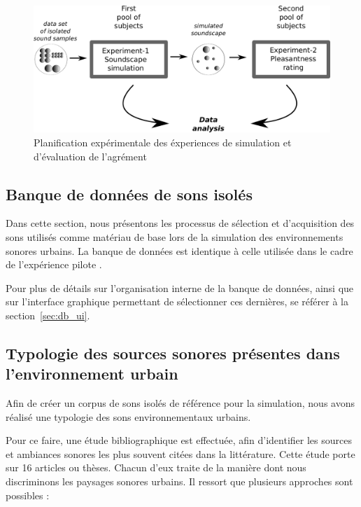 \begin{figure}[t]
        \myfloatalign
        \includegraphics[width=.8\linewidth]{gfx/5}
        \caption{Planification expérimentale des éxperiences de simulation et d'évaluation de l'agrément}\label{fig:xp1_2}
\end{figure}



\subsection{Banque de données de sons isolés}

Dans cette section, nous présentons les processus de sélection et d'acquisition des sons utilisés comme matériau de base lors de la simulation des environnements sonores urbains. La banque de données est identique à celle utilisée dans le cadre de l'expérience pilote \citep{lafay2013atiam,lafay2014new}. 

Pour plus de détails sur l'organisation interne de la banque de données, ainsi que sur l'interface graphique permettant de sélectionner ces dernières, se référer à la section~\ref{sec:db_ui}.

\subsection{Typologie des sources sonores présentes dans l'environnement urbain}

Afin de créer un corpus de sons isolés de référence pour la simulation, nous avons réalisé une typologie des sons environnementaux urbains. 

Pour ce faire, une étude bibliographique est effectuée, afin d'identifier les sources et ambiances sonores les plus souvent citées dans la littérature. Cette étude porte sur 16 articles ou thèses. Chacun d'eux traite de la manière dont nous discriminons les paysages sonores urbains. Il ressort que plusieurs approches sont possibles :

